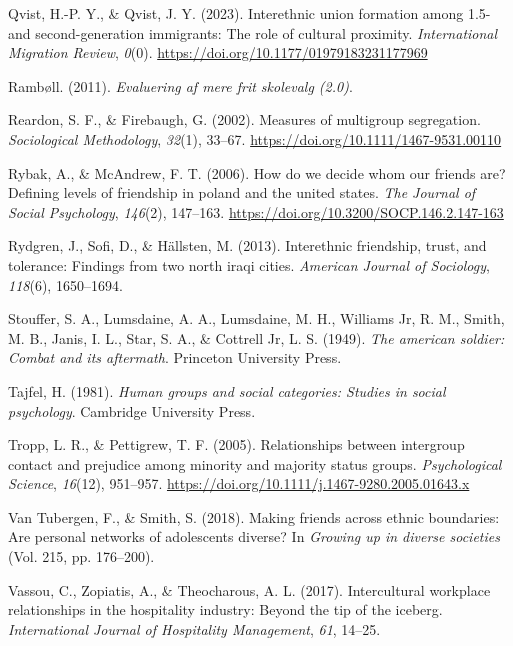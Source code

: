 \documentclass[
]{book}
\newlength{\cslhangindent}
\newenvironment{CSLReferences}[2] %
 {\begin{list}{}{%
  \setlength{\itemindent}{0pt}
  \setlength{\leftmargin}{0pt}
  \setlength{\parsep}{0pt}
  \ifodd #1
   \setlength{\leftmargin}{\cslhangindent}
   \setlength{\itemindent}{-1\cslhangindent}
  \fi
  \setlength{\itemsep}{#2\baselineskip}}}
 {\end{list}}
\begin{document}
\begin{CSLReferences}{1}{0}
Qvist, H.-P. Y., \& Qvist, J. Y. (2023). Interethnic union formation among 1.5- and second-generation immigrants: The role of cultural proximity. \emph{International Migration Review}, \emph{0}(0). \url{https://doi.org/10.1177/01979183231177969}

Rambøll. (2011). \emph{Evaluering af mere frit skolevalg (2.0)}.

Reardon, S. F., \& Firebaugh, G. (2002). Measures of multigroup segregation. \emph{Sociological Methodology}, \emph{32}(1), 33--67. \url{https://doi.org/10.1111/1467-9531.00110}

Rybak, A., \& McAndrew, F. T. (2006). How do we decide whom our friends are? Defining levels of friendship in poland and the united states. \emph{The Journal of Social Psychology}, \emph{146}(2), 147--163. \url{https://doi.org/10.3200/SOCP.146.2.147-163}

Rydgren, J., Sofi, D., \& Hällsten, M. (2013). Interethnic friendship, trust, and tolerance: Findings from two north iraqi cities. \emph{American Journal of Sociology}, \emph{118}(6), 1650--1694.

Stouffer, S. A., Lumsdaine, A. A., Lumsdaine, M. H., Williams Jr, R. M., Smith, M. B., Janis, I. L., Star, S. A., \& Cottrell Jr, L. S. (1949). \emph{The american soldier: Combat and its aftermath}. Princeton University Press.

Tajfel, H. (1981). \emph{Human groups and social categories: Studies in social psychology}. Cambridge University Press.

Tropp, L. R., \& Pettigrew, T. F. (2005). Relationships between intergroup contact and prejudice among minority and majority status groups. \emph{Psychological Science}, \emph{16}(12), 951--957. \url{https://doi.org/10.1111/j.1467-9280.2005.01643.x}

Van Tubergen, F., \& Smith, S. (2018). Making friends across ethnic boundaries: Are personal networks of adolescents diverse? In \emph{Growing up in diverse societies} (Vol. 215, pp. 176--200).

Vassou, C., Zopiatis, A., \& Theocharous, A. L. (2017). Intercultural workplace relationships in the hospitality industry: Beyond the tip of the iceberg. \emph{International Journal of Hospitality Management}, \emph{61}, 14--25.


\end{CSLReferences}
\end{document}
